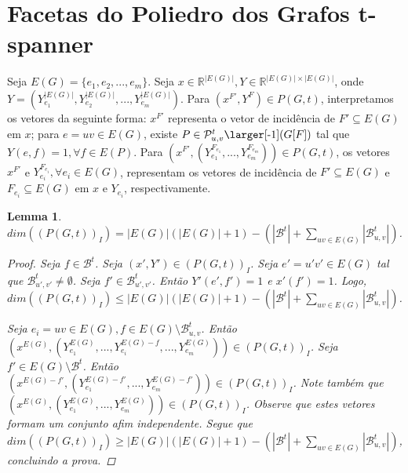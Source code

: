 \documentclass[11pt,reqno]{amsart}
\newcommand{\smallF}{\mbox{\larger[-1]$(G[F])$}}
\newcommand{\spanPath}{\mathcal{P}}
\newcommand{\spanBridge}{\mathcal{B}}
\newcommand{\Pathuv}{\spanPath_{u,v}^{t}}
\newcommand{\PathuvF}{\Pathuv\smallF}
\newcommand{\BridgeuvPrime}{\spanBridge_{u',v'}^{t}}
\newcommand{\Bridgeuv}{\spanBridge_{u,v}^{t}}
\newcommand{\Bridge}{\spanBridge^{t}}
\newtheorem{lema}{Lemma}
\newcommand{\espacoX}{\mathbb{R}^{|E(G)|}}
\newcommand{\espacoY}{\mathbb{R}^{|E(G)| \times |E(G)|}}
\begin{document}
\section{Facetas do Poliedro dos Grafos t-spanner}
Seja $E(G) = \{e_1, e_2, ..., e_m\}$. Seja $x \in \espacoX, Y \in \espacoY$, 
onde $Y = (Y_{e_1}^{|E(G)|}, Y_{e_2}^{|E(G)|}, ..., Y_{e_m}^{|E(G)|})$. 
Para $(x^{F'},Y^{F}) \in P(G,t)$, interpretamos os vetores da seguinte forma: 
$x^{F'}$ representa o vetor de incidência de $F' \subseteq E(G)$ em $x$; 
para $e = uv \in E(G)$, existe $P \in \PathuvF$ tal que 
$Y(e,f) = 1, \forall f \in E(P)$. 
Para $(x^{F'},(Y_{e_1}^{F_{e_1}},...,Y_{e_m}^{F_{e_m}})) \in P(G,t)$, os vetores 
$x^{F'}$ e $Y_{e_i}^{F_{e_i}}, \forall e_i \in E(G)$, representam os vetores de 
incidência de $F' \subseteq E(G)$ e $F_{e_i} \subseteq E(G)$ em $x$ e $Y_{e_i}$, 
respectivamente.

\begin{lema}
$dim((P(G,t))_{I}) = |E(G)|(|E(G)|+1) - (|\Bridge|+\sum_{uv \in E(G)}|\Bridgeuv|)$.

\begin{proof}
Seja $f \in \Bridge$. Seja $(x',Y') \in (P(G,t))_I$. 
Seja $e'=u'v' \in E(G)$ tal que $\BridgeuvPrime \neq \emptyset$. Seja 
$f'\in \BridgeuvPrime$. Então $Y'(e',f') = 1$ e $x'(f') = 1$.
Logo, \\
\mbox{$dim((P(G,t))_{I}) \le |E(G)|(|E(G)|+1) - (|\Bridge|+\sum_{uv \in E(G)}|\Bridgeuv|)$}.

Seja $e_i=uv \in E(G), f \in E(G) \setminus \Bridgeuv$. Então \\
\mbox{$(x^{E(G)}, (Y_{e_1}^{E(G)}, ..., Y_{e_i}^{E(G)-f}, ..., Y_{e_m}^{E(G)})) \in (P(G,t))_{I}$}. Seja $f' \in E(G) \setminus \Bridge$. Então 
$(x^{E(G)-f'},(Y_{e_1}^{E(G)-f'},...,Y_{e_m}^{E(G)-f'})) \in (P(G,t))_{I}$.
Note também que \\
\mbox{$(x^{E(G)},(Y_{e_1}^{E(G)},...,Y_{e_m}^{E(G)})) \in (P(G,t))_{I}$}. 
Observe que estes vetores formam um conjunto afim independente. Segue que \\
\mbox{$dim((P(G,t))_{I}) \ge |E(G)|(|E(G)|+1) - (|\Bridge|+\sum_{uv \in E(G)}|\Bridgeuv|)$}, concluindo a prova.
\end{proof}
\end{lema}
\end{document}

